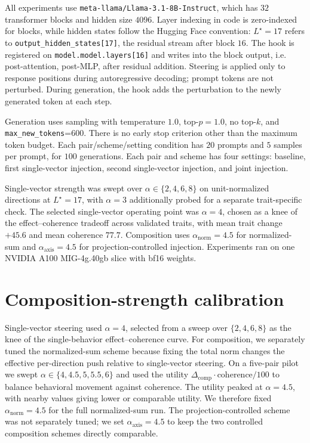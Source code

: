 \documentclass{article}
\begin{document}
All experiments use \texttt{meta-llama/Llama-3.1-8B-Instruct}, which has $32$ transformer blocks and
hidden size $4096$. Layer indexing in code is zero-indexed for blocks, while hidden states follow
the Hugging Face convention: $L^\star=17$ refers to \texttt{output\_hidden\_states[17]}, the residual
stream after block $16$. The hook is registered on \texttt{model.model.layers[16]} and writes into
the block output, i.e. post-attention, post-MLP, after residual addition. Steering is applied only to
response positions during autoregressive decoding; prompt tokens are not perturbed. During
generation, the hook adds the perturbation to the newly generated token at each step.

Generation uses sampling with temperature $1.0$, top-$p=1.0$, no top-$k$, and
\texttt{max\_new\_tokens}=600. There is no early stop criterion other than the maximum token budget.
Each pair/scheme/setting condition has $20$ prompts and $5$ samples per prompt, for $100$
generations. Each pair and scheme has four settings: baseline, first single-vector injection, second
single-vector injection, and joint injection.

Single-vector strength was swept over $\alpha\in\{2,4,6,8\}$ on unit-normalized directions at
$L^\star=17$, with $\alpha=3$ additionally probed for a separate trait-specific check. The selected
single-vector operating point was $\alpha=4$, chosen as a knee of the effect--coherence tradeoff
across validated traits, with mean trait change $+45.6$ and mean coherence $77.7$. Composition uses
$\alpha_{\mathrm{norm}}=4.5$ for normalized-sum and $\alpha_{\mathrm{axis}}=4.5$ for
projection-controlled injection. Experiments ran on one NVIDIA A100 MIG-4g.40gb slice with bf16
weights.

\section{Composition-strength calibration}
\label{app:composition-strength}

Single-vector steering used $\alpha=4$, selected from a sweep over $\{2,4,6,8\}$ as the knee of the
single-behavior effect--coherence curve. For composition, we separately tuned the normalized-sum
scheme because fixing the total norm changes the effective per-direction push relative to
single-vector steering. On a five-pair pilot we swept $\alpha\in\{4,4.5,5,5.5,6\}$ and used the
utility $\Delta_{\mathrm{comp}}\cdot \mathrm{coherence}/100$ to balance behavioral movement against
coherence. The utility peaked at $\alpha=4.5$, with nearby values giving lower or comparable utility.
We therefore fixed $\alpha_{\mathrm{norm}}=4.5$ for the full normalized-sum run. The
projection-controlled scheme was not separately tuned; we set $\alpha_{\mathrm{axis}}=4.5$ to keep
the two controlled composition schemes directly comparable.
\end{document}
